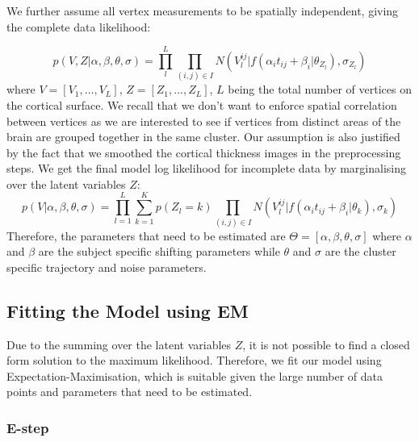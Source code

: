 \documentclass{llncs}
\DeclareMathOperator*{\argmax}{arg\,max}
\begin{document}
We further assume all vertex measurements to be spatially independent, giving the complete data likelihood:

\begin{equation}
 p(V, Z | \alpha, \beta, \theta, \sigma) = \prod_l^L \prod_{(i,j) \in I} N(V_l^{ij} | f(\alpha_i t_{ij} + \beta_i | \theta_{Z_l}), \sigma_{Z_l})
\end{equation}
where $V = [V_1, \dots, V_L]$, $Z = [Z_1, \dots, Z_L]$, $L$ being the total number of vertices on the cortical surface. We recall that we don't want to enforce spatial correlation between vertices as we are interested to see if vertices from distinct areas of the brain are grouped together in the same cluster. Our assumption is also justified by the fact that we smoothed the cortical thickness images in the preprocessing steps. We get the final model log likelihood for incomplete data by marginalising over the latent variables $Z$:
\begin{equation}
 p(V|\alpha, \beta, \theta, \sigma) = \prod_{l=1}^L \sum_{k=1}^K p(Z_l = k) \prod_{(i,j) \in I} N(V_l^{ij} | f(\alpha_i t_{ij} + \beta_i | \theta_k), \sigma_k)
\end{equation}
Therefore, the parameters that need to be estimated are $\Theta = [\alpha, \beta, \theta, \sigma]$ where $\alpha$ and $\beta$ are the subject specific shifting parameters while $\theta$ and $\sigma$ are the cluster specific trajectory and noise parameters. 

\subsection{Fitting the Model using EM}

Due to the summing over the latent variables $Z$, it is not possible to find a closed form solution to the maximum likelihood. Therefore, we fit our model using Expectation-Maximisation, which is suitable given the large number of data points and parameters that need to be estimated. 


\subsubsection{E-step}
\end{document}
